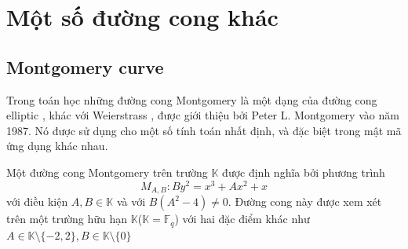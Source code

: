 \documentclass[a4paper,12pt]{report}
\begin{document}
\section{Một số đường cong khác}
\subsection*{Montgomery curve}
Trong toán học những đường cong Montgomery là một dạng của đường cong elliptic , khác với Weierstrass , được giới thiệu bởi Peter L. Montgomery vào năm 1987. Nó được sử dụng cho một số tính toán nhất định, và đặc biệt trong mật mã ứng dụng khác nhau.

Một đường cong Montgomery trên trường $\mathbb{K}$ được định nghĩa bởi phương trình 
\begin{displaymath}
M_{A,B}: By^2 = x^3 + Ax^2 + x
\end{displaymath}
với điều kiện $A, B \in \mathbb{K}$ và với $B(A^2 - 4) \neq 0$. Đường cong này được xem xét trên một trường hữu hạn $\mathbb{K}$($\mathbb{K} = \mathbb{F}_q$) với hai đặc điểm khác như $A \in \mathbb{K} \setminus \{-2, 2\}, B \in \mathbb{K} \setminus\{0\}$
\end{document}
